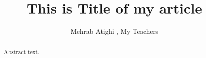 \documentclass[preprint,12pt]{elsarticle}
\begin{document}
\begin{frontmatter}



\title{This is Title of my article}


\author{Mehrab Atighi , My Teachers} %


\begin{abstract}
Abstract text.
\end{abstract}

%

\begin{keyword}



\end{keyword}

\end{frontmatter}
\end{document}
